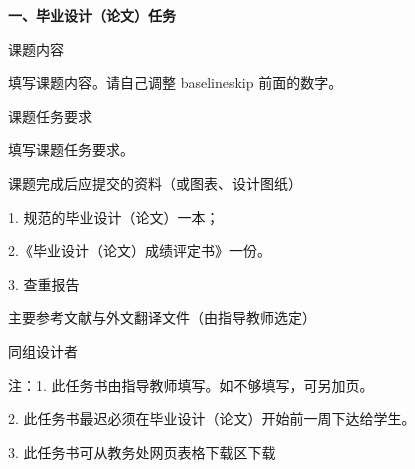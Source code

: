 \documentclass{csustThesis}
\begin{document}
\makeTaskBookCover

\pagestyle{empty}  %

{\noindent{}\bfseries 一、毕业设计（论文）任务}

\begin{ubox}[breakable,]
\noindent 课题内容

填写课题内容。请自己调整 baselineskip 前面的数字。

\vspace*{13\baselineskip}


\end{ubox}

\vspace{-\baselineskip}

\begin{ubox}
\noindent 课题任务要求

填写课题任务要求。

\end{ubox}

\vspace{-\baselineskip}

\begin{ubox}[breakable,]
\noindent   课题完成后应提交的资料（或图表、设计图纸）

1. 规范的毕业设计（论文）一本；

2.《毕业设计（论文）成绩评定书》一份。

3. 查重报告

\vspace*{1\baselineskip}
\end{ubox}

\vspace{-\baselineskip}

\begin{ubox}[breakable,]
\noindent 主要参考文献与外文翻译文件（由指导教师选定）

\nocite{*}  %
\printbibliography[heading=none]

\vspace*{1\baselineskip}
\end{ubox}

\vspace{-\baselineskip}

\begin{ubox}
\noindent 同组设计者

\vspace*{\baselineskip}
\end{ubox}

\noindent 注：1. 此任务书由指导教师填写。如不够填写，可另加页。

2. 此任务书最迟必须在毕业设计（论文）开始前一周下达给学生。

3. 此任务书可从教务处网页表格下载区下载
\end{document}
